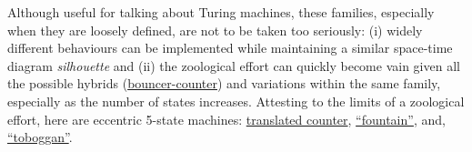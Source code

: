 \documentclass[sigconf,screen]{acmart}
\theoremstyle{definition} %
\numberwithin{equation}{section}
\theoremstyle{definition} %
\begin{document}
Although useful for talking about Turing machines, these families, especially when they are loosely defined, are not to be taken too seriously: (i) widely different behaviours can be implemented while maintaining a similar space-time diagram \textit{silhouette} and (ii) the zoological effort can quickly become vain given all the possible hybrids (\eg \href{https://bbchallenge.org/1RB---_1LC1RE_0RD0LC_1LB1LA_0RA1RE}{bouncer-counter}) and variations within the same family, especially as the number of states increases. Attesting to the limits of a zoological effort, here are eccentric 5-state machines: \href{https://bbchallenge.org/1RB0RA_1LC0LD_1RE1RD_1LA1LB_---1RC}{translated counter}, \href{https://bbchallenge.org/1RB0RD_1LC1LB_1RA0LB_0RE1RD_---1RA}{``fountain''}, and, \href{https://bbchallenge.org/1RB0RC_0LC---_1RD1RC_0LE1RA_1RD1LE}{``toboggan''}.





\end{document}
